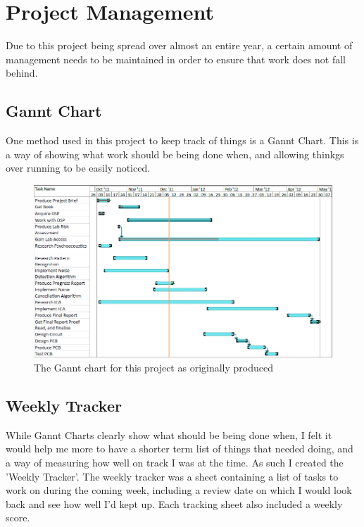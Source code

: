 \section{Project Management}
Due to this project being spread over almost an entire year, a certain amount of management needs to be maintained in order to ensure that work does not fall behind.

\subsection{Gannt Chart}
One method used in this project to keep track of things is a Gannt Chart.
This is a way of showing what work should be being done when, and allowing thinkgs over running to be easily noticed.

\begin{figure}[h]
	\centering
	\includegraphics[width=\textwidth]{./img/ganntori.png}
	\caption{The Gannt chart for this project as originally produced}
	\label{fig:gannt}
\end{figure}

\subsection{Weekly Tracker}
While Gannt Charts clearly show what should be being done when, I felt it would help me more to have a shorter term list of things that needed doing, and a way of measuring how well on track I was at the time. As such I created the 'Weekly Tracker'.
The weekly tracker was a sheet containing a list of tasks to work on during the coming week, including a review date on which I would look back and see how well I'd kept up. Each tracking sheet also included a weekly score.

